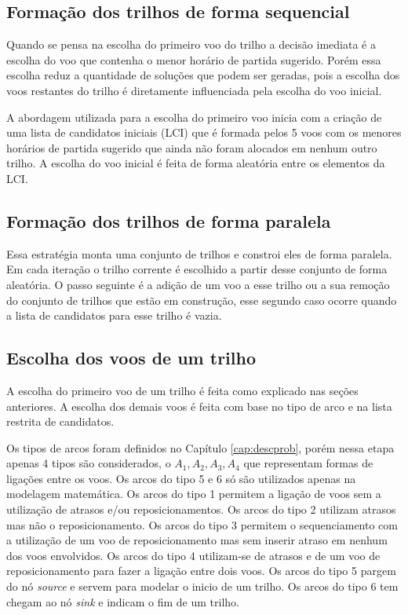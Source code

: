 \subsection{Formação dos trilhos de forma sequencial}

Quando se pensa na escolha do primeiro voo do trilho a decisão imediata é a
escolha do voo que contenha o menor horário de partida sugerido. Porém essa
escolha reduz a quantidade de soluções que podem ser geradas, pois a escolha
dos voos restantes do trilho é diretamente influenciada pela escolha do voo
inicial.

A abordagem utilizada para a escolha do primeiro voo inicia com a criação de
uma lista de candidatos iniciais (LCI) que é formada pelos 5 voos com os menores
horários de partida sugerido que ainda não foram alocados em nenhum outro
trilho. A escolha do voo inicial é feita de forma aleatória entre os elementos da LCI.


\subsection{Formação dos trilhos de forma paralela}
  
Essa estratégia monta uma conjunto de trilhos e constroi eles de forma
paralela. Em cada iteração o trilho corrente é escolhido a partir desse
conjunto de forma aleatória. O passo seguinte é a adição de um voo a esse
trilho ou a sua remoção do conjunto de trilhos que estão em construção, esse
segundo caso ocorre quando a lista de candidatos para esse trilho é vazia.
  
\subsection{Escolha dos voos de um trilho}

A escolha do primeiro voo de um trilho é feita como explicado nas seções
anteriores. A escolha dos demais voos é feita com base no tipo de arco e na
lista restrita de candidatos.
 
Os tipos de arcos foram definidos no Capítulo \ref{cap:descprob}, porém nessa
etapa apenas 4 tipos são considerados, o   $A_{1},A_{2},A_{3},A_{4}$ que
representam formas de ligações entre os voos. Os arcos do tipo 5 e 6 só são
utilizados apenas na modelagem matemática. Os arcos do tipo 1 permitem a
ligação de voos sem a utilização de atrasos e/ou reposicionamentos. Os arcos do
tipo 2 utilizam atrasos mas não o reposicionamento. Os arcos do tipo 3 permitem
o sequenciamento com a utilização de um voo de reposicionamento mas sem inserir
atraso em nenhum dos voos envolvidos. Os arcos do tipo 4 utilizam-se de atrasos
e de um voo de reposicionamento para fazer a ligação entre dois voos. Os arcos
do tipo 5 pargem do nó \textit{source} e servem para modelar o inicio de um
trilho. Os arcos do tipo 6 tem chegam ao nó \textit{sink} e indicam o fim de um
trilho.
 
